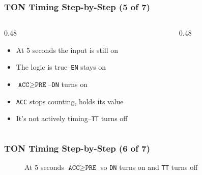\begin{frame}
    \frametitle{TON Timing Step-by-Step (5 of 7)}

    \begin{columns}
        \begin{column}{0.48\linewidth}
            \begin{itemize}
                \item At 5 seconds the input is still on
                \item The logic is true--\texttt{EN} stays on
                \item $\texttt{ACC} \geq \texttt{PRE}$--\texttt{DN} turns on
                \item \texttt{ACC} stops counting, holds its value
                \item It's not actively timing--\texttt{TT} turns off
            \end{itemize}
        \end{column}
        \begin{column}{0.48\linewidth}
            \begin{figure}
                \centering
                \resizebox{\columnwidth}{!}{
                    
                }
            \end{figure}  
        \end{column}
    \end{columns}
\end{frame}

\begin{frame}
    \frametitle{TON Timing Step-by-Step (6 of 7)}

    \begin{figure}
        \centering
        
        
        \vspace{1em}
        {\small At 5 seconds $\texttt{ACC} \geq \texttt{PRE}$ so \texttt{DN} turns on and \texttt{TT} turns off\par}
    \end{figure}
\end{frame}

